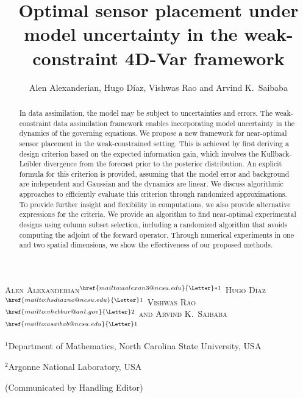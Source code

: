\documentclass{aims} %
\title[Optimal sensor placement in the WC4D-Var framework]
{Optimal sensor placement under model uncertainty in the weak-constraint 4D-Var framework} %
\author[Alen Alexanderian, Hugo D\'iaz, Vishwas Rao and Arvind K.\ Saibaba]{Alen Alexanderian, Hugo D\'iaz, Vishwas Rao and Arvind K.\ Saibaba}
\theoremstyle{definition}
\begin{document}
\maketitle

\centerline{\scshape
Alen Alexanderian$^{{\href{mailto:aalexan3@ncsu.edu}{\textrm{\Letter}}}*1}$
Hugo D\'iaz$^{{\href{mailto:hsdiazno@ncsu.edu}{\textrm{\Letter}}}1}$
Vishwas Rao$^{{\href{mailto:vhebbur@anl.gov}{\textrm{\Letter}}}2}$
and Arvind K.\ Saibaba$^{{\href{mailto:asaibab@ncsu.edu}{\textrm{\Letter}}}1}$
}

\medskip

{\footnotesize
 \centerline{$^1$Department of Mathematics, North Carolina State University, USA}
} %

\medskip

{\footnotesize
 \centerline{$^2$Argonne National Laboratory, USA}
}

\bigskip

 \centerline{(Communicated by Handling Editor)}


\begin{abstract}
In data assimilation, the model may be subject to uncertainties and errors. The weak-constraint data assimilation framework enables incorporating model uncertainty in the dynamics of the governing equations.
We propose a new framework for near-optimal sensor placement in the weak-constrained setting. 
This is achieved by first deriving a design criterion based on the expected information gain, which involves the Kullback-Leibler divergence from the forecast prior to the posterior distribution.
An explicit formula for this criterion is provided, assuming that the model error and background are independent and Gaussian and the dynamics are linear.
We discuss algorithmic approaches to efficiently evaluate this criterion through randomized approximations.
 To provide further insight and flexibility in computations,
 we also provide alternative expressions for the criteria.
We provide an algorithm to find near-optimal experimental designs using column subset selection, including a randomized algorithm that avoids computing the adjoint of the forward operator.
Through numerical experiments in one and two spatial dimensions, we show the effectiveness of our proposed methods.
\end{abstract}
\end{document}
